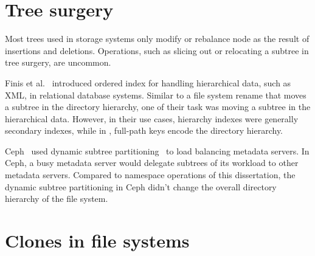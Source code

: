 \section{Tree surgery}

Most trees used in storage systems only modify or rebalance node as the result
of insertions and deletions.
Operations, such as slicing out or relocating a subtree in tree surgery,
are uncommon.

Finis et al.~\citep{orderindex} introduced ordered index for handling
hierarchical data, such as XML, in relational database systems.
Similar to a file system rename that moves a subtree in the directory hierarchy,
one of their task was moving a subtree in the hierarchical data.
However, in their use cases, hierarchy indexes were generally secondary
indexes,
while in \betrfs, full-path keys encode the directory hierarchy.

Ceph~\citep{ceph} used dynamic subtree partitioning~\citep{cephtree}
to load balancing metadata servers.
In Ceph, a busy metadata server would delegate subtrees of its workload to other
metadata servers.
Compared to namespace operations of this dissertation,
the dynamic subtree partitioning in Ceph didn't change the overall directory
hierarchy of the file system.

\section{Clones in file systems}


